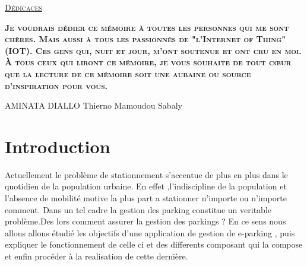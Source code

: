 \documentclass[12pt, openany]{report}
\begin{document}
   \vfill
    \vfill
        \newpage
           \thispagestyle{empty}
           \begin{center}
                 \LARGE
               \textsc{   \underline{Dédicaces}}
                  \end{center}
                   \begin{center}

                      \LARGE
\begin{description}
\textbf{
\textsc{
Je voudrais dédier ce mémoire à toutes les personnes qui me sont chères. Mais aussi à tous les passionnés de "l'Internet of Thing"(IOT). Ces gens qui, nuit et jour, m'ont soutenue et ont cru en moi. À tous ceux qui liront ce mémoire, je vous souhaite de tout cœur que la lecture de ce mémoire soit une aubaine ou source d'inspiration pour vous.}}
\end{description}



               \vfill
               \begin{flushright}
               AMINATA  DIALLO
               \newline
               Thierno Mamoudou Sabaly
               \end{flushright}

                      \end{center}
           \vfill
      \newpage

   \large
   \tableofcontents
   \large
   \listoffigures
    \large
     \listoftables

      \vfill
   \newpage
      \thispagestyle{empty}

   \vfill

   \chapter{Introduction}
Actuellement le problème de stationnement  s'accentue de plus en plus dans le quotidien de la population urbaine.
\newline 
En effet  ,l'indiscipline de la population  et l'absence de mobilité motive la plus part a stationner n'importe ou n'importe comment.
Dans un tel cadre la gestion des parking constitue un veritable problème.Des lors comment assurer la gestion des parkings ? 
\newline
En ce sens nous allons allons étudié les objectifs d'une application de gestion de e-parking , puis expliquer le fonctionnement de celle ci et des differents composant  qui la compose et  enfin procéder à la realisation de cette dernière. 
\end{document}
